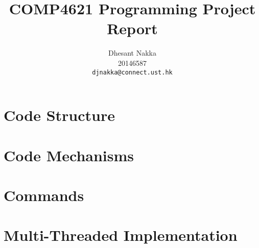 \documentclass[11pt,a4paper,titlepage]{article}
\title{COMP4621 Programming Project Report}
\author{
  Dhesant Nakka \\
  20146587 \\
  \texttt{djnakka@connect.ust.hk}
}
\begin{document}
\maketitle

\section{Code Structure}

\section{Code Mechanisms}

\section{Commands}

\section{Multi-Threaded Implementation}

\nocite{}
\end{document}
